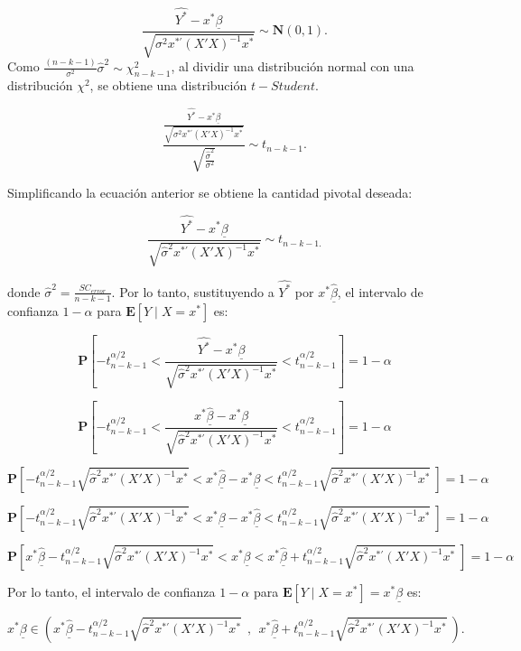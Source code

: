 \documentclass[
  a4paper,
  oneside,
  openany]{book}
\begin{document}
\[\frac{\hat{Y^*}-x^*\underline{\beta}}{\sqrt{\sigma^2 x^{*'}(X'X)^{-1}x^*}}\sim \mathbf{N}(0,1).\]
Como \(\frac{(n-k-1)}{\sigma^2}\hat{\sigma}^2 \sim \chi^2_{n-k-1}\), al dividir una distribución normal con una distribución \(\chi^2\), se obtiene una distribución \(t-Student.\)

\[\frac{\frac{\hat{Y^*}-x^*\underline{\beta}}{\sqrt{\sigma^2 x^{*'}(X'X)^{-1}x^*}}}{\sqrt{\frac{\hat{\sigma}^2}{\sigma^2}}} \sim t_{n-k-1}.\]

Simplificando la ecuación anterior se obtiene la cantidad pivotal deseada:

\[\frac{\hat{Y^*}-x^*\underline{\beta}}{\sqrt{\hat{\sigma}^2 x^{*'}(X'X)^{-1}x^*}}\sim t_{n-k-1.}\]

donde \(\hat{\sigma}^2=\frac{SC_{error}}{n-k-1}.\) Por lo tanto, sustituyendo a \(\hat{Y^*}\) por \(x^*\underline{\hat{\beta}}\), el intervalo de confianza \(1-\alpha\) para \(\mathbf{E}[Y \mid X=x^*]\) es:

\[\mathbf{P}\left[ -t^{\alpha/2}_{n-k-1}<\frac{\hat{Y^*}-x^*\underline{\beta}}{\sqrt{\hat{\sigma}^2 x^{*'}(X'X)^{-1}x^*}}  <t^{\alpha/2}_{n-k-1}\right]=1-\alpha\]

\[\mathbf{P}\left[ -t^{\alpha/2}_{n-k-1}<\frac{x^*\underline{\hat{\beta}}-x^*\underline{\beta}}{\sqrt{\hat{\sigma}^2 x^{*'}(X'X)^{-1}x^*}}  <t^{\alpha/2}_{n-k-1}\right]=1-\alpha\]

\[\mathbf{P}\left[ -t^{\alpha/2}_{n-k-1}\sqrt{\hat{\sigma}^2 x^{*'}(X'X)^{-1}x^*}<x^*\underline{\hat{\beta}}-x^*\underline{\beta}  <t^{\alpha/2}_{n-k-1}\sqrt{\hat{\sigma}^2 x^{*'}(X'X)^{-1}x^*} \ \right]=1-\alpha\]

\[\mathbf{P}\left[ -t^{\alpha/2}_{n-k-1}\sqrt{\hat{\sigma}^2 x^{*'}(X'X)^{-1}x^*}<x^*\underline{\beta}-x^*\underline{\hat{\beta}}  <t^{\alpha/2}_{n-k-1}\sqrt{\hat{\sigma}^2 x^{*'}(X'X)^{-1}x^*} \ \right]=1-\alpha\]

\[\mathbf{P}\left[ x^*\underline{\hat{\beta}}-t^{\alpha/2}_{n-k-1}\sqrt{\hat{\sigma}^2 x^{*'}(X'X)^{-1}x^*}<x^*\underline{\beta}  <x^*\underline{\hat{\beta}}+t^{\alpha/2}_{n-k-1}\sqrt{\hat{\sigma}^2 x^{*'}(X'X)^{-1}x^*} \ \right]=1-\alpha\]

Por lo tanto, el intervalo de confianza \(1-\alpha\) para \(\mathbf{E}[Y \mid X=x^*]=x^*\underline{\beta}\) es:

\[x^*\underline{\beta} \in \left(x^*\underline{\hat{\beta}}-t^{\alpha/2}_{n-k-1}\sqrt{\hat{\sigma}^2 x^{*'}(X'X)^{-1}x^*} \ \ , \ \ x^*\underline{\hat{\beta}}+t^{\alpha/2}_{n-k-1}\sqrt{\hat{\sigma}^2 x^{*'}(X'X)^{-1}x^*} \ \right).\]
\end{document}
